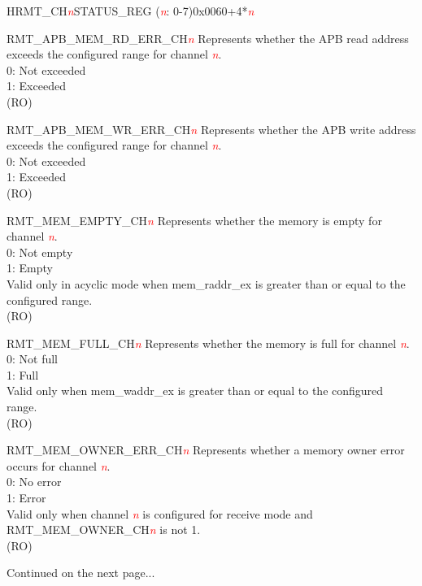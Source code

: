 \begin{register}{H}{RMT\_CH\textcolor{red}{\it{n}}STATUS\_REG (\textcolor{red}{\it{n}}: 0-7)}{0x0060+4*\textcolor{red}{\it{n}}}\label{regdesc:RMTCHnSTATUSREG}
%
%
%
%
%
%
%
%
%
%
\regnewline%
\begin{regdesc}\begin{reglist}
\item [RMT\_APB\_MEM\_RD\_ERR\_CH\textcolor{red}{\it{n}}] Represents whether the APB read address exceeds the configured range for channel \textcolor{red}{\it{n}}.\\
0: Not exceeded\\
1: Exceeded\\ (RO)
\item [RMT\_APB\_MEM\_WR\_ERR\_CH\textcolor{red}{\it{n}}] Represents whether the APB write address exceeds the configured range for channel \textcolor{red}{\it{n}}.\\
0: Not exceeded\\
1: Exceeded\\ (RO)
\item [RMT\_MEM\_EMPTY\_CH\textcolor{red}{\it{n}}] Represents whether the memory is empty for channel \textcolor{red}{\it{n}}.\\
0: Not empty\\
1: Empty\\
Valid only in acyclic mode when mem\_raddr\_ex is greater than or equal to the configured range.\\ (RO)
\item [RMT\_MEM\_FULL\_CH\textcolor{red}{\it{n}}] Represents whether the memory is full for channel \textcolor{red}{\it{n}}.\\
0: Not full\\
1: Full\\
Valid only when mem\_waddr\_ex is greater than or equal to the configured range.\\ (RO)
\item [RMT\_MEM\_OWNER\_ERR\_CH\textcolor{red}{\it{n}}] Represents whether a memory owner error occurs for channel \textcolor{red}{\it{n}}.\\
0: No error\\
1: Error\\
Valid only when channel \textcolor{red}{\it{n}} is configured for receive mode and RMT\_MEM\_OWNER\_CH\textcolor{red}{\it{n}} is not 1.\\ (RO)

\item [Continued on the next page...]
\end{reglist}\end{regdesc}
\end{register}

